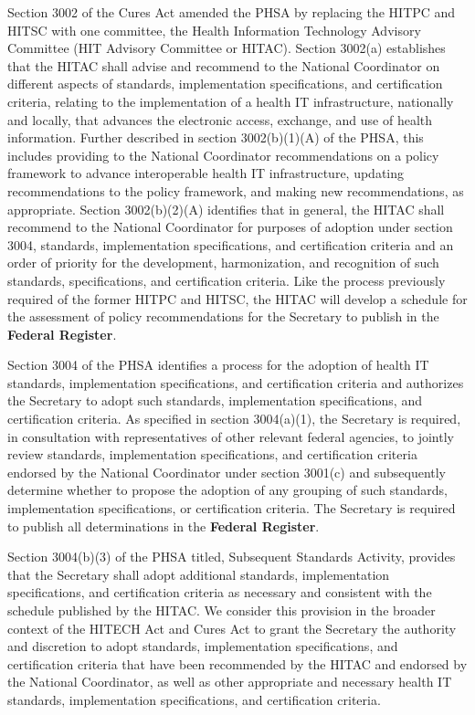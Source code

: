 \documentclass[twoside,11pt]{article}
\begin{document}
          Section 3002 of the Cures Act amended the PHSA by replacing the HITPC and HITSC with one committee, the Health Information Technology Advisory Committee (HIT Advisory Committee or HITAC). Section 3002(a) establishes that the HITAC shall advise and recommend to the National Coordinator on different aspects of standards, implementation specifications, and certification criteria, relating to the implementation of a health IT infrastructure, nationally and locally, that advances the electronic access, exchange, and use of health information. Further described in section 3002(b)(1)(A) of the PHSA, this includes providing to the National Coordinator recommendations on a policy framework to advance interoperable health IT infrastructure, updating recommendations to the policy framework, and making new recommendations, as appropriate. Section 3002(b)(2)(A) identifies that in general, the HITAC shall recommend to the National Coordinator for purposes of adoption under section 3004, standards, implementation specifications, and certification criteria and an order of priority for the development, harmonization, and recognition of such standards, specifications, and certification criteria. Like the process previously required of the former HITPC and HITSC, the HITAC will develop a schedule for the assessment of policy recommendations for the Secretary to publish in the \textbf{Federal Register}.



          Section 3004 of the PHSA identifies a process for the adoption of health IT standards, implementation specifications, and certification criteria and authorizes the Secretary to adopt such standards, implementation specifications, and certification criteria. As specified in section 3004(a)(1), the Secretary is required, in consultation with representatives of other relevant federal agencies, to jointly review standards, implementation specifications, and certification criteria endorsed by the National Coordinator under section 3001(c) and subsequently  \ifhmode\expandafter\xspace\fi determine whether to propose the adoption of any grouping of such standards, implementation specifications, or certification criteria. The Secretary is required to publish all determinations in the \textbf{Federal Register}.


          Section 3004(b)(3) of the PHSA titled, Subsequent Standards Activity, provides that the Secretary shall adopt additional standards, implementation specifications, and certification criteria as necessary and consistent with the schedule published by the HITAC. We consider this provision in the broader context of the HITECH Act and Cures Act to grant the Secretary the authority and discretion to adopt standards, implementation specifications, and certification criteria that have been recommended by the HITAC and endorsed by the National Coordinator, as well as other appropriate and necessary health IT standards, implementation specifications, and certification criteria.
\end{document}
